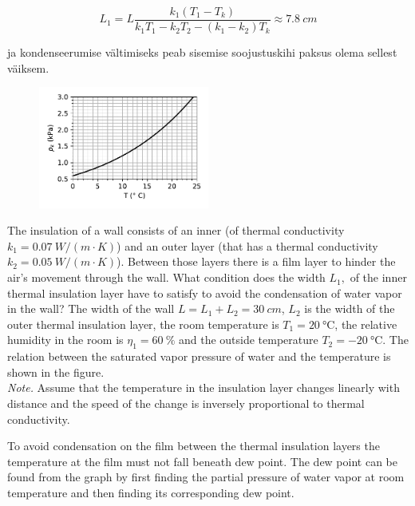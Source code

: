 \begin{equation*}
L_{1}=L\frac{k_{1}\left(T_{1}-T_{k}\right)}{k_{1}T_{1}-k_{2}T_{2}-\left(k_{1}-k_{2}\right)T_{k}}\approx\SI{7.8}{cm}
\end{equation*}

\noindent ja kondenseerumise vältimiseks peab sisemise soojustuskihi
paksus olema sellest väiksem.

\begin{figure}
\vspace{-30pt}
\begin{center}
\includegraphics[width=0.5\textwidth]{2018-v3g-05-kullastunud-aur}
\par\end{center} 
\end{figure}
The insulation of a wall consists of an inner (of thermal conductivity $k_{1}=\SI{0.07}{W/\left(m\cdot K\right)}$) and an outer layer (that has a thermal conductivity $k_{2}=\SI{0.05}{W/\left(m\cdot K\right)}$). Between those layers there is a film layer to hinder the air’s movement through the wall. What condition does the width $L_{1},$ of the inner thermal insulation layer have to satisfy to avoid the condensation of water vapor in the wall? The width of the wall $L=L_{1}+L_{2}=\SI{30}{cm}$, $L_{2}$ is the width of the outer thermal insulation layer, the room temperature is $T_{1}=\SI{20}{\degreeCelsius}$, the relative humidity in the room is $\eta_{1}=\SI{60}{\percent}$ and the outside temperature $T_{2}=\SI{-20}{\degreeCelsius}$. The relation between the saturated vapor pressure of water and the temperature is shown in the figure.\\
\emph{Note.} Assume that the temperature in the insulation layer changes linearly with distance and the speed of the change is inversely proportional to thermal conductivity.

\hinteng
To avoid condensation on the film between the thermal insulation layers the temperature at the film must not fall beneath dew point. The dew point can be found from the graph by first finding the partial pressure of water vapor at room temperature and then finding its corresponding dew point.


